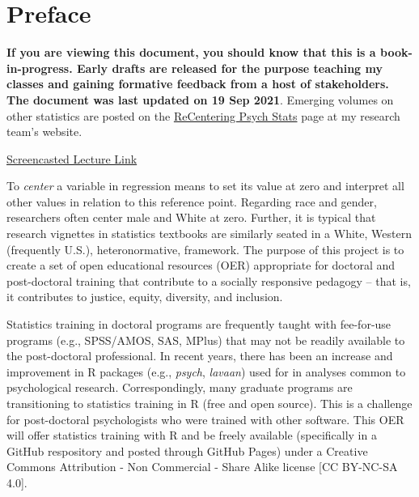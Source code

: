 \documentclass[
  english,
]{book}
\begin{document}
\hypertarget{preface}{%
\chapter*{Preface}\label{preface}}

\textbf{If you are viewing this document, you should know that this is a book-in-progress. Early drafts are released for the purpose teaching my classes and gaining formative feedback from a host of stakeholders. The document was last updated on 19 Sep 2021}. Emerging volumes on other statistics are posted on the \href{https://lhbikos.github.io/BikosRVT/ReCenter.html}{ReCentering Psych Stats} page at my research team's website.

\href{https://spu.hosted.panopto.com/Panopto/Pages/Viewer.aspx?id=c932455e-ef06-444a-bdca-acf7012d759a}{Screencasted Lecture Link}

To \emph{center} a variable in regression means to set its value at zero and interpret all other values in relation to this reference point. Regarding race and gender, researchers often center male and White at zero. Further, it is typical that research vignettes in statistics textbooks are similarly seated in a White, Western (frequently U.S.), heteronormative, framework. The purpose of this project is to create a set of open educational resources (OER) appropriate for doctoral and post-doctoral training that contribute to a socially responsive pedagogy -- that is, it contributes to justice, equity, diversity, and inclusion.

Statistics training in doctoral programs are frequently taught with fee-for-use programs (e.g., SPSS/AMOS, SAS, MPlus) that may not be readily available to the post-doctoral professional. In recent years, there has been an increase and improvement in R packages (e.g., \emph{psych}, \emph{lavaan}) used for in analyses common to psychological research. Correspondingly, many graduate programs are transitioning to statistics training in R (free and open source). This is a challenge for post-doctoral psychologists who were trained with other software. This OER will offer statistics training with R and be freely available (specifically in a GitHub respository and posted through GitHub Pages) under a Creative Commons Attribution - Non Commercial - Share Alike license {[}CC BY-NC-SA 4.0{]}.
\end{document}
